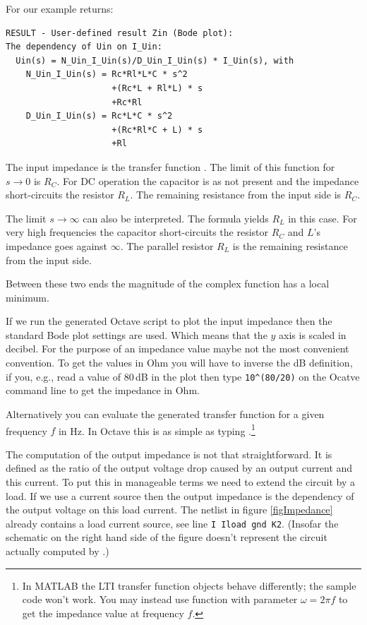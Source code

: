 For our example \linnet{} returns:
\begin{verbatim}
RESULT - User-defined result Zin (Bode plot):
The dependency of Uin on I_Uin:
  Uin(s) = N_Uin_I_Uin(s)/D_Uin_I_Uin(s) * I_Uin(s), with
    N_Uin_I_Uin(s) = Rc*Rl*L*C * s^2
                     +(Rc*L + Rl*L) * s
                     +Rc*Rl
    D_Uin_I_Uin(s) = Rc*L*C * s^2
                     +(Rc*Rl*C + L) * s
                     +Rl
\end{verbatim}
The input impedance is the transfer function
. The limit of this function for
$s \to 0$ is $R_C$. For DC operation the capacitor is as not present and
the impedance short-circuits the resistor $R_L$. The remaining resistance
from the input side is $R_C$.

The limit $s \to \infty$ can also be interpreted. The formula yields $R_L$
in this case. For very high frequencies the capacitor short-circuits the
resistor $R_C$ and $L$'s impedance goes against $\infty$. The parallel
resistor $R_L$ is the remaining resistance from the input side.

Between these two ends the magnitude of the complex function has a local
minimum.

If we run the generated Octave script  to plot the input
impedance then the standard Bode plot settings are used. Which means that
the $y$ axis is scaled in decibel. For the purpose of an impedance value
maybe not the most convenient convention. To get the values in Ohm
you will have to inverse the dB definition, if you, e.g., read a value of
80\,dB in the plot then type \verb+10^(80/20)+ on the Ocatve command
line to get the impedance in Ohm.

Alternatively you can evaluate the generated transfer function for a given
frequency $f$ in Hz. In Octave this is as simple as typing
.\footnote{In MATLAB the LTI transfer function
objects behave differently; the sample code won't work. You may instead
use function  with parameter $\omega=2 \pi f$ to get the
impedance value at frequency $f$.}

The computation of the output impedance is not that straightforward. It is
defined as the ratio of the output voltage drop caused by an output
current and this current. To put this in \linnet{} manageable terms we
need to extend the circuit by a load. If we use a current source then the
output impedance is the dependency of the output voltage on this load
current. The netlist in figure \ref{figImpedance} already contains a load
current source, see line \verb+I Iload gnd K2+. (Insofar the schematic on
the right hand side of the figure doesn't represent the circuit actually
computed by \linnet{}.)

